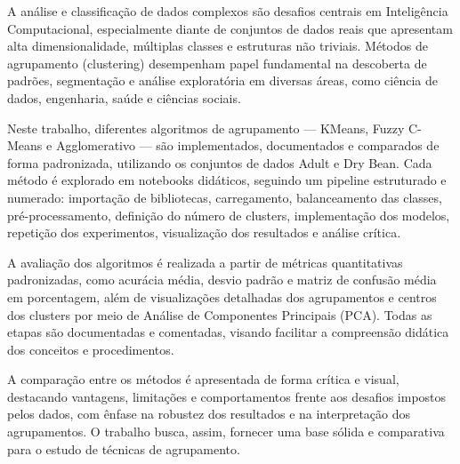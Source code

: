 A análise e classificação de dados complexos são desafios centrais em Inteligência Computacional, especialmente diante de conjuntos de dados reais que apresentam alta dimensionalidade, múltiplas classes e estruturas não triviais. Métodos de agrupamento (clustering) desempenham papel fundamental na descoberta de padrões, segmentação e análise exploratória em diversas áreas, como ciência de dados, engenharia, saúde e ciências sociais.

Neste trabalho, diferentes algoritmos de agrupamento — KMeans, Fuzzy C-Means e Agglomerativo — são implementados, documentados e comparados de forma padronizada, utilizando os conjuntos de dados Adult e Dry Bean. Cada método é explorado em notebooks didáticos, seguindo um pipeline estruturado e numerado: importação de bibliotecas, carregamento, balanceamento das classes, pré-processamento, definição do número de clusters, implementação dos modelos, repetição dos experimentos, visualização dos resultados e análise crítica.

A avaliação dos algoritmos é realizada a partir de métricas quantitativas padronizadas, como acurácia média, desvio padrão e matriz de confusão média em porcentagem, além de visualizações detalhadas dos agrupamentos e centros dos clusters por meio de Análise de Componentes Principais (PCA). Todas as etapas são documentadas e comentadas, visando facilitar a compreensão didática dos conceitos e procedimentos.

A comparação entre os métodos é apresentada de forma crítica e visual, destacando vantagens, limitações e comportamentos frente aos desafios impostos pelos dados, com ênfase na robustez dos resultados e na interpretação dos agrupamentos. O trabalho busca, assim, fornecer uma base sólida e comparativa para o estudo de técnicas de agrupamento.